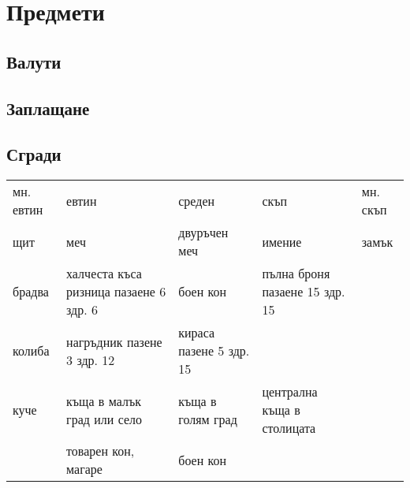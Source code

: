 \section{Предмети}
\subsection{Валути}
\subsection{Заплащане}
\subsection{Сгради}
\begin{tabular}{p{3cm} | p{3cm} | p{3cm} | p{3cm} | p{3cm}}
мн. евтин & евтин                                   & среден                  & скъп                           & мн. скъп  \\
щит       & меч                                     & двуръчен меч            & имение                         & замък     \\
брадва    & халчеста къса ризница пазаене 6 здр. 6  & боен кон                & пълна броня пазаене 15 здр. 15 &           \\
колиба    & нагръдник пазене 3 здр. 12              & кираса пазене 5 здр. 15 &                                &           \\
куче      & къща в малък град или село              & къща в голям град       & централна къща в столицата                 \\
          & товарен кон, магаре                     & боен кон                &
\end{tabular}

